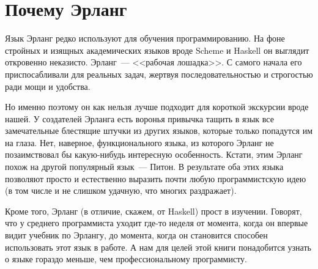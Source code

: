 \documentclass[
  paper=a4,
  fontsize=14pt,
  openany,
  appendixprefix=true
]{scrbook}
\begin{document}
\section{Почему Эрланг}

Язык Эрланг редко используют для обучения программированию. На фоне стройных и изящных академических языков вроде Scheme и Haskell он выглядит откровенно неказисто. Эрланг~--- <<рабочая лошадка>>. С самого начала его приспосабливали для реальных задач, жертвуя последовательностью и строгостью ради мощи и удобства.

Но именно поэтому он как нельзя лучше подходит для короткой экскурсии вроде нашей. У создателей Эрланга есть воронья привычка тащить в язык все замечательные блестящие штучки из других языков, которые только попадутся им на глаза. Нет, наверное, функционального языка, из которого Эрланг не позаимствовал бы какую-нибудь интересную особенность. Кстати, этим Эрланг похож на другой популярный язык~--- Питон. В результате оба этих языка позволяют просто и естественно выразить почти любую программистскую идею (в том числе и не слишком удачную, что многих раздражает).

Кроме того, Эрланг (в отличие, скажем, от Haskell) прост в изучении. Говорят, что у среднего программиста уходит где-то неделя от момента, когда он впервые видит учебник по Эрлангу, до момента, когда он становится способен использовать этот язык в работе. А нам для целей этой книги понадобится узнать о языке гораздо меньше, чем профессиональному программисту.
\end{document}
